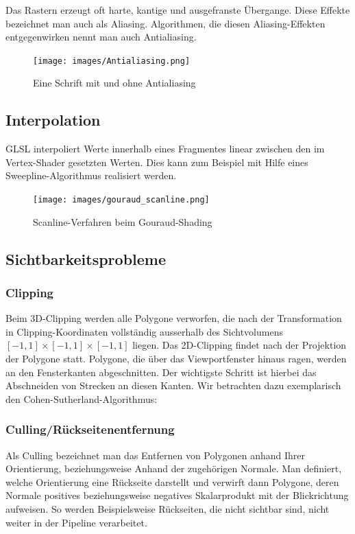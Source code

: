 Das Rastern erzeugt oft harte, kantige und ausgefranste Übergange. Diese Effekte bezeichnet man auch als Aliasing. Algorithmen, die diesen Aliasing-Effekten entgegenwirken nennt man auch Antialiasing. 
\begin{figure}[H]
    \centering
    \texttt{[image: images/Antialiasing.png]}
    \caption{Eine Schrift mit und ohne Antialiasing}
    \label{fig:screening-antialiasing-font}
\end{figure}

\subsection*{Interpolation}
GLSL interpoliert Werte innerhalb eines Fragmentes linear zwischen den im Vertex-Shader gesetzten Werten.
Dies kann  zum Beispiel mit Hilfe eines Sweepline-Algorithmus realisiert werden.
\begin{figure}[H]
    \centering
    \texttt{[image: images/gouraud\_scanline.png]}
    \caption{Scanline-Verfahren beim Gouraud-Shading}
    \label{fig:gouraud-shading-scanline}
\end{figure}


\subsection*{Sichtbarkeitsprobleme}

\subsubsection*{Clipping}
Beim 3D-Clipping werden alle Polygone verworfen, die nach der Transformation in Clipping-Koordinaten vollständig ausserhalb des Sichtvolumens
$[-1,1] \times [-1,1] \times [-1,1] $ liegen. Das 2D-Clipping findet nach der Projektion der Polygone statt. Polygone, die über das Viewportfenster hinaus ragen, werden an den Fensterkanten abgeschnitten.
Der wichtigste Schritt ist hierbei das Abschneiden von Strecken an diesen Kanten. Wir betrachten dazu exemplarisch den Cohen-Sutherland-Algorithmus:

\begin{Algorithmus}
\end{Algorithmus}

\subsubsection*{Culling/Rückseitenentfernung}
Als Culling bezeichnet man das Entfernen von Polygonen anhand Ihrer Orientierung, beziehungsweise Anhand der zugehörigen Normale. Man definiert, welche Orientierung eine Rückseite darstellt und verwirft dann Polygone, deren Normale positives beziehungsweise negatives Skalarprodukt mit der Blickrichtung aufweisen. So werden Beispielsweise Rückseiten, die nicht sichtbar sind, nicht weiter in der Pipeline verarbeitet.

